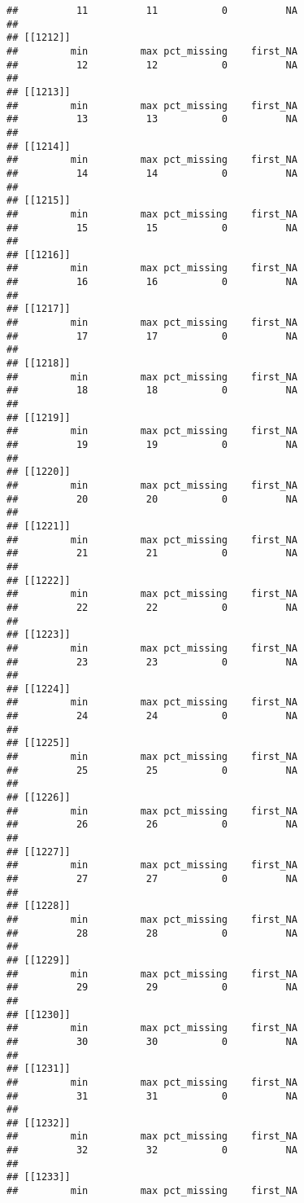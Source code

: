 \documentclass[
]{article}
\begin{document}
\begin{verbatim}
##          11          11           0          NA 
## 
## [[1212]]
##         min         max pct_missing    first_NA 
##          12          12           0          NA 
## 
## [[1213]]
##         min         max pct_missing    first_NA 
##          13          13           0          NA 
## 
## [[1214]]
##         min         max pct_missing    first_NA 
##          14          14           0          NA 
## 
## [[1215]]
##         min         max pct_missing    first_NA 
##          15          15           0          NA 
## 
## [[1216]]
##         min         max pct_missing    first_NA 
##          16          16           0          NA 
## 
## [[1217]]
##         min         max pct_missing    first_NA 
##          17          17           0          NA 
## 
## [[1218]]
##         min         max pct_missing    first_NA 
##          18          18           0          NA 
## 
## [[1219]]
##         min         max pct_missing    first_NA 
##          19          19           0          NA 
## 
## [[1220]]
##         min         max pct_missing    first_NA 
##          20          20           0          NA 
## 
## [[1221]]
##         min         max pct_missing    first_NA 
##          21          21           0          NA 
## 
## [[1222]]
##         min         max pct_missing    first_NA 
##          22          22           0          NA 
## 
## [[1223]]
##         min         max pct_missing    first_NA 
##          23          23           0          NA 
## 
## [[1224]]
##         min         max pct_missing    first_NA 
##          24          24           0          NA 
## 
## [[1225]]
##         min         max pct_missing    first_NA 
##          25          25           0          NA 
## 
## [[1226]]
##         min         max pct_missing    first_NA 
##          26          26           0          NA 
## 
## [[1227]]
##         min         max pct_missing    first_NA 
##          27          27           0          NA 
## 
## [[1228]]
##         min         max pct_missing    first_NA 
##          28          28           0          NA 
## 
## [[1229]]
##         min         max pct_missing    first_NA 
##          29          29           0          NA 
## 
## [[1230]]
##         min         max pct_missing    first_NA 
##          30          30           0          NA 
## 
## [[1231]]
##         min         max pct_missing    first_NA 
##          31          31           0          NA 
## 
## [[1232]]
##         min         max pct_missing    first_NA 
##          32          32           0          NA 
## 
## [[1233]]
##         min         max pct_missing    first_NA 

\end{verbatim}
\end{document}

